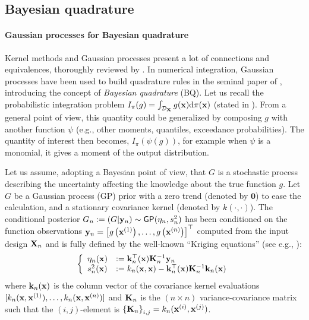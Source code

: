 
\subsection{Bayesian quadrature}
\paragraph{Gaussian processes for Bayesian quadrature}%

Kernel methods and Gaussian processes present a lot of connections and equivalences, thoroughly reviewed by \cite{motonobu_2018}. 
In numerical integration, Gaussian processes have been used to build quadrature rules in the seminal paper of \cite{ohagan_1991}, introducing the concept of \emph{Bayesian quadrature} (BQ). 
Let us recall the probabilistic integration problem $I_\pi(g) = \int_{\mathcal{D}_{\bf X}} g({\bf x}) \mathrm{d} \pi({\bf x})$ (stated in ). 
From a general point of view, this quantity could be generalized by composing $g$ with another function $\psi$ (e.g., other moments, quantiles, exceedance probabilities). 
The quantity of interest then becomes, $I_\pi(\psi(g))$, for example when $\psi$ is a monomial, it gives a moment of the output distribution.

Let us assume, adopting a Bayesian point of view, that $G$ is a stochastic process describing the uncertainty affecting the knowledge about the true function $g$. 
Let $G$ be a Gaussian process (GP) prior with a zero trend (denoted by $\textbf{0}$) to ease the calculation, and a stationary covariance kernel (denoted by $k(\cdot, \cdot)$). 
The conditional posterior $G_n := (G | {\bf y}_n) \sim \mathsf{GP}(\eta_n, s_n^2)$ has been conditioned on the function observations ${\bf y}_n = \left[g\left({\bf x}^{(1)}\right), \ldots, g\left({\bf x}^{(n)}\right)\right]^\top$ computed from the input design ${\bf X}_n$ and is fully defined by the well-known ``Kriging equations'' (see e.g., \cite{rasmussen_2006}):
\begin{equation}
    \left\{
    \begin{array}{ll}
        \eta_n({\bf x}) &:= {\bf k}_n^\top({\bf x}) {\bf K}_n^{-1} {\bf y}_n\\
        s_n^2({\bf x}) &:= k_n({\bf x}, {\bf x}) - {\bf k}_n^\top({\bf x}) {\bf K}_n^{-1} {\bf k}_n({\bf x})
    \end{array}
\right.
\label{eq:kriging}
\end{equation}
where ${\bf k}_n({\bf x})$ is the column vector of the covariance kernel evaluations $[k_n({\bf x}, {\bf x}^{(1)}), \dots,\allowbreak k_n({\bf x}, {\bf x}^{(n)})]$ and ${\bf K}_n$ is the $(n \times n)$ variance-covariance matrix such that the $(i, j)$-element is $\left\{{\bf K}_n \right\}_{i, j}=k_n({\bf x}^{(i)}, {\bf x}^{(j)})$.

